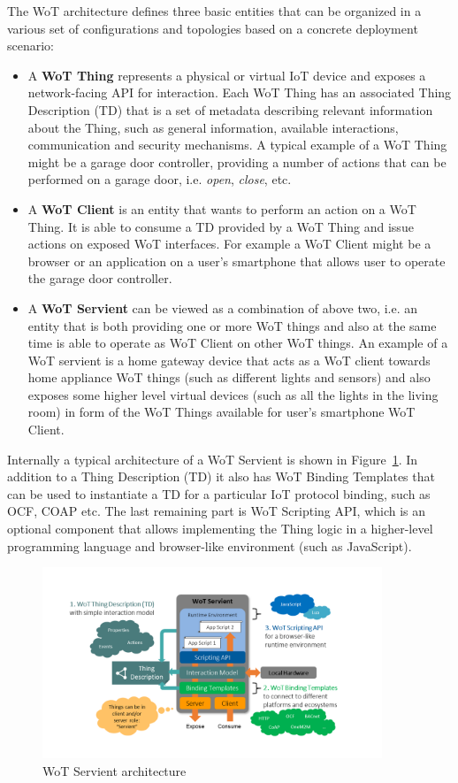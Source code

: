 
The WoT architecture\cite{Wot2017arch} defines three basic entities that can be organized in a various set of configurations and topologies based on a concrete deployment scenario:

\begin{itemize}
	\item A \textbf{WoT Thing} represents a physical or virtual IoT device and exposes a network-facing API for interaction.
	Each WoT Thing has an associated Thing Description (TD)\cite{Wot2017td} that is a set of metadata describing relevant information about the Thing, such as general information, available interactions, communication and security mechanisms.
	A typical example of a WoT Thing might be a garage door controller, providing a number of actions that can be performed on a garage door, i.e. \textit{open}, \textit{close}, etc.
	\item A \textbf{WoT Client} is an entity that wants to perform an action on a WoT Thing.
	It is able to consume a TD provided by a WoT Thing and issue actions on exposed WoT interfaces.
	For example a WoT Client might be a browser or an application on a user's smartphone that allows user to operate the garage door controller. 
	\item A \textbf{WoT Servient} can be viewed as a combination of above two, i.e. an entity that is both providing one or more WoT things and also at the same time is able to operate as WoT Client on other WoT things.
	An example of a WoT servient is a home gateway device that acts as a WoT client towards home appliance WoT things (such as different lights and sensors) and also exposes some higher level virtual devices (such as all the lights in the living room) in form of the WoT Things available for user's smartphone WoT Client.
\end{itemize}

Internally a typical architecture of a WoT Servient is shown in Figure~\ref{fig-fservient}. 
In addition to a Thing Description (TD) it also has WoT Binding Templates that can be used to instantiate a TD for a particular IoT protocol binding, such as OCF, COAP etc. 
The last remaining part is WoT Scripting API, which is an optional component that allows implementing the Thing logic in a higher-level programming language and browser-like environment (such as JavaScript). 

\begin{figure}[!t]
\centering
\includegraphics[width=4in]{figures/wot-servient.png}
\caption{WoT Servient architecture}
\label{fig-fservient}
\end{figure}


